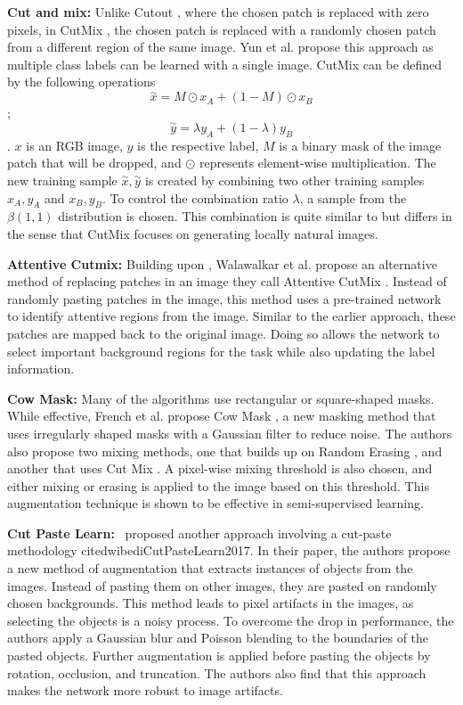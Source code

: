 \textbf{Cut and mix: }
Unlike Cutout \cite{devriesImprovedRegularizationConvolutional2017}, where the chosen patch is replaced with zero pixels, in CutMix \cite{yunCutMixRegularizationStrategy2019}, the chosen patch is replaced with a randomly chosen patch from a different region of the same image. Yun et al. propose this approach as multiple class labels can be learned with a single image.
CutMix can be defined by the following operations $$\overset{\sim}x = M \odot x_{A} + (1-M) \odot x_{B}$$ ; $$\overset{\sim}y = \lambda y_{A}+ (1- \lambda)y_{B}$$. $x$ is an RGB image, $y$ is the respective label, $M$ is a binary mask of the image patch that will be dropped, and $\odot$ represents element-wise multiplication. The new training sample $\overset{\sim}x , \overset{\sim}y$ is created by combining two other training samples $x_{A}, y_{A}$ and $x_{B} , y_{B}$. To control the combination ratio $\lambda$, a sample from the $\beta(1,1)$ distribution is chosen. This combination is quite similar to \cite{zhangMixupEmpiricalRisk2018} but differs in the sense that CutMix focuses on generating locally natural images.

\textbf{Attentive Cutmix: }
Building upon \cite{yunCutMixRegularizationStrategy2019}, Walawalkar et al. propose an alternative method of replacing patches in an image they call Attentive CutMix \cite{walawalkarAttentiveCutMixEnhanced2020}. Instead of randomly pasting patches in the image, this method uses a pre-trained network to identify attentive regions from the image. Similar to the earlier approach, these patches are mapped back to the original image. Doing so allows the network to select important background regions for the task while also updating the label information.

\textbf{Cow Mask: }
Many of the algorithms use rectangular or square-shaped masks. While effective, French et al. propose Cow Mask \cite{frenchMilkingCowMaskSemiSupervised2020}, a new masking method that uses irregularly shaped masks with a Gaussian filter to reduce noise. The authors also propose two mixing methods, one that builds up on Random Erasing \cite{zhongRandomErasingData2020}, and another that uses Cut Mix \cite{yunCutMixRegularizationStrategy2019}. A pixel-wise mixing threshold is also chosen, and either mixing or erasing is applied to the image based on this threshold. This augmentation technique is shown to be effective in semi-supervised learning.

\textbf{Cut Paste Learn: }
\ proposed another approach involving a cut-paste methodology cite{dwibediCutPasteLearn2017}. In their paper, the authors propose a new method of augmentation that extracts instances of objects from the images. Instead of pasting them on other images, they are pasted on randomly chosen backgrounds. This method leads to pixel artifacts in the images, as selecting the objects is a noisy process. To overcome the drop in performance, the authors apply a Gaussian blur and Poisson blending to the boundaries of the pasted objects. Further augmentation is applied before pasting the objects by rotation, occlusion, and truncation. The authors also find that this approach makes the network more robust to image artifacts.

